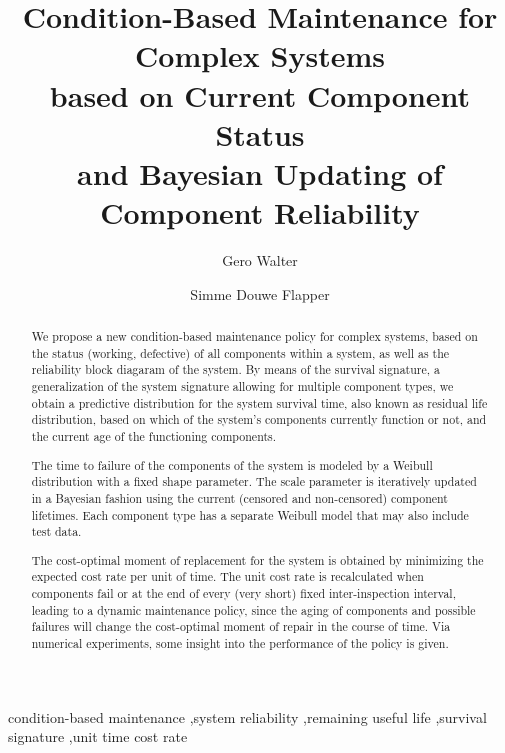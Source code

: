 \documentclass[authoryear]{elsarticle}
\begin{document}

\begin{frontmatter}
\title{Condition-Based Maintenance for Complex Systems\\ based on Current Component Status\\ and Bayesian Updating of Component Reliability}

\author[tue]{Gero Walter}
\author[tue]{Simme Douwe Flapper}

\address[tue]{School of Industrial Engineering, Eindhoven University of Technology, Eindhoven, Netherlands}


\begin{abstract}
We propose a new condition-based maintenance policy for complex systems,
based on the status (working, defective) of all components within a system,
as well as the reliability block diagaram of the system.
%
By means of the survival signature,
a generalization of the system signature allowing for multiple component types,
we obtain a predictive distribution for the system survival time,
also known as residual life distribution,
based on which of the system's components currently function or not,
and the current age of the functioning components.

The time to failure of the components of the system
is modeled by a Weibull distribution with a fixed shape parameter.
The scale parameter is iteratively updated in a Bayesian fashion
using the current (censored and non-censored) component lifetimes.
Each component type has a separate Weibull model that may also include test data.

The cost-optimal moment of replacement for the system is obtained by minimizing
the expected cost rate per unit of time.
The unit cost rate is recalculated when components fail
or at the end of every (very short) fixed inter-inspection interval,
leading to a dynamic maintenance policy,
since the aging of components and possible failures will change the cost-optimal moment of repair in the course of time.
Via numerical experiments, some insight into the performance of the policy is given.
\end{abstract}

\begin{keyword}
condition-based maintenance \sep system reliability \sep remaining useful life \sep survival signature \sep unit time cost rate\end{keyword}
\end{frontmatter}
\end{document}
